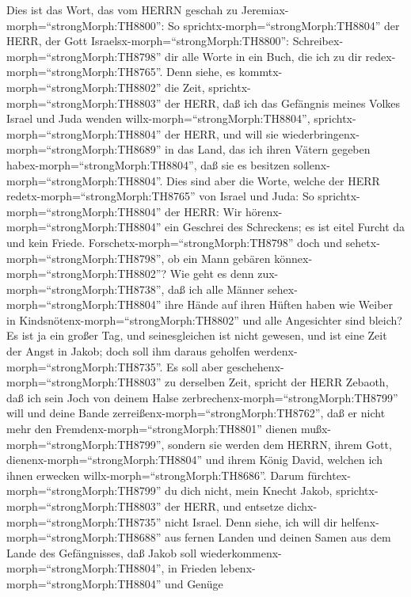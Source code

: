  Dies ist das Wort, das vom HERRN geschah zu
Jeremiax-morph=``strongMorph:TH8800'':  So
sprichtx-morph=``strongMorph:TH8804'' der HERR, der Gott
Israelsx-morph=``strongMorph:TH8800'':
Schreibex-morph=``strongMorph:TH8798'' dir alle Worte in ein Buch, die
ich zu dir redex-morph=``strongMorph:TH8765''.  Denn siehe,
es kommtx-morph=``strongMorph:TH8802'' die Zeit,
sprichtx-morph=``strongMorph:TH8803'' der HERR, daß ich das Gefängnis
meines Volkes Israel und Juda wenden willx-morph=``strongMorph:TH8804'',
sprichtx-morph=``strongMorph:TH8804'' der HERR, und will sie
wiederbringenx-morph=``strongMorph:TH8689'' in das Land, das ich ihren
Vätern gegeben habex-morph=``strongMorph:TH8804'', daß sie es besitzen
sollenx-morph=``strongMorph:TH8804''.  Dies sind aber die
Worte, welche der HERR redetx-morph=``strongMorph:TH8765'' von Israel
und Juda:  So sprichtx-morph=``strongMorph:TH8804'' der
HERR: Wir hörenx-morph=``strongMorph:TH8804'' ein Geschrei des
Schreckens; es ist eitel Furcht da und kein Friede. 
Forschetx-morph=``strongMorph:TH8798'' doch und
sehetx-morph=``strongMorph:TH8798'', ob ein Mann gebären
könnex-morph=``strongMorph:TH8802''? Wie geht es denn
zux-morph=``strongMorph:TH8738'', daß ich alle Männer
sehex-morph=``strongMorph:TH8804'' ihre Hände auf ihren Hüften haben wie
Weiber in Kindsnötenx-morph=``strongMorph:TH8802'' und alle Angesichter
sind bleich?  Es ist ja ein großer Tag, und seinesgleichen
ist nicht gewesen, und ist eine Zeit der Angst in Jakob; doch soll ihm
daraus geholfen werdenx-morph=``strongMorph:TH8735''.  Es
soll aber geschehenx-morph=``strongMorph:TH8803'' zu derselben Zeit,
spricht der HERR Zebaoth, daß ich sein Joch von deinem Halse
zerbrechenx-morph=``strongMorph:TH8799'' will und deine Bande
zerreißenx-morph=``strongMorph:TH8762'', daß er nicht mehr den
Fremdenx-morph=``strongMorph:TH8801'' dienen
mußx-morph=``strongMorph:TH8799'',  sondern sie werden dem
HERRN, ihrem Gott, dienenx-morph=``strongMorph:TH8804'' und ihrem König
David, welchen ich ihnen erwecken willx-morph=``strongMorph:TH8686''.
 Darum fürchtex-morph=``strongMorph:TH8799'' du dich nicht,
mein Knecht Jakob, sprichtx-morph=``strongMorph:TH8803'' der HERR, und
entsetze dichx-morph=``strongMorph:TH8735'' nicht Israel. Denn siehe,
ich will dir helfenx-morph=``strongMorph:TH8688'' aus fernen Landen und
deinen Samen aus dem Lande des Gefängnisses, daß Jakob soll
wiederkommenx-morph=``strongMorph:TH8804'', in Frieden
lebenx-morph=``strongMorph:TH8804'' und Genüge
